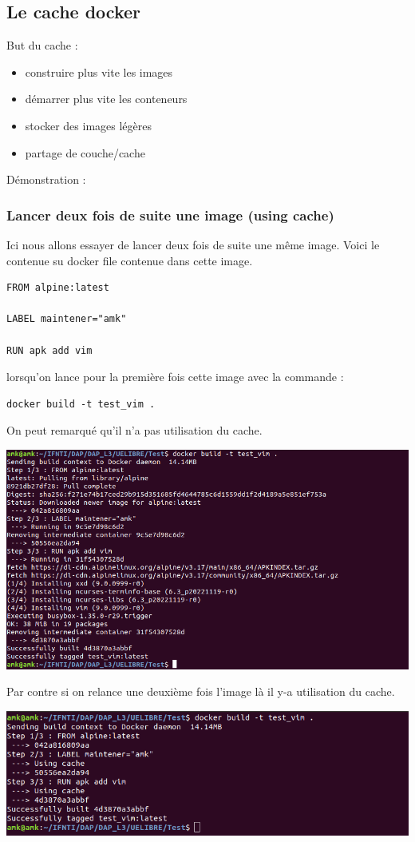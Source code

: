 \documentclass[12pt,a4paper]{article}
\begin{document}
\subsection{Le cache docker}
But du cache : 
\begin{itemize}
\item construire plus vite les images
\item démarrer plus vite les conteneurs
\item stocker des images légères
\item partage de couche/cache
\end{itemize}
Démonstration : \\
\subsubsection{Lancer deux fois de suite une image (using cache)}
Ici nous allons essayer de lancer deux fois de suite une même image. Voici 
le contenue su docker file contenue dans cette image.
\begin{verbatim}
FROM alpine:latest

LABEL maintener="amk"

RUN apk add vim
\end{verbatim}
lorsqu'on lance pour la première fois cette image avec la commande :
\begin{verbatim}
docker build -t test_vim .
\end{verbatim}
On peut remarqué qu'il n'a pas utilisation du cache.
\begin{center}
\includegraphics[scale=0.3]{img/test_vim.png}
\end{center}
Par contre si on relance une deuxième fois l'image là il y-a utilisation du cache.
\begin{center}
\includegraphics[scale=0.3]{img/test_vim_cache.png}
\end{center}
\end{document}

